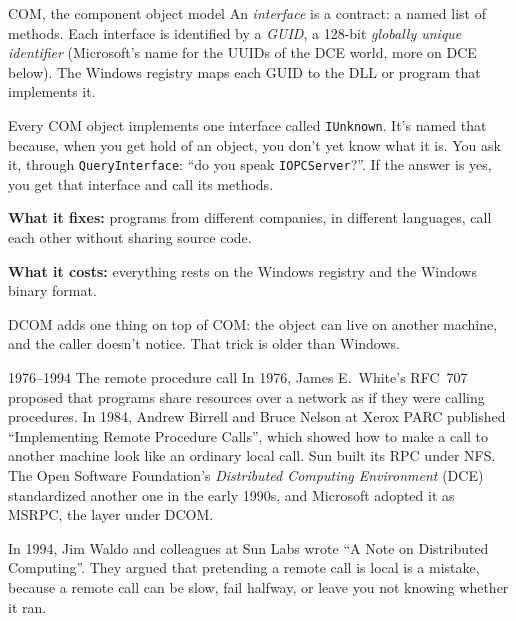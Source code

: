 \begin{concept}{COM, the component object model}
An \emph{interface} is a contract: a named list of methods. Each interface is
identified by a \emph{GUID}, a 128-bit \emph{globally unique identifier}
(Microsoft's name for the UUIDs of the DCE world, more on DCE below). The
Windows registry maps each GUID to the DLL or program that implements it.

Every COM object implements one interface called \texttt{IUnknown}. It's named
that because, when you get hold of an object, you don't yet know what it is. You
ask it, through \texttt{QueryInterface}: ``do you speak \texttt{IOPCServer}?''.
If the answer is yes, you get that interface and call its methods.

\textbf{What it fixes:} programs from different companies, in different
languages, call each other without sharing source code.

\textbf{What it costs:} everything rests on the Windows registry and the Windows
binary format.
\end{concept}

DCOM adds one thing on top of COM: the object can live on another machine, and
the caller doesn't notice. That trick is older than Windows.

\begin{history}{1976--1994 \textperiodcentered{} The remote procedure call}
In 1976, James E.\ White's RFC~707 proposed that programs share resources over
a network as if they were calling procedures. In 1984, Andrew Birrell and Bruce
Nelson at Xerox PARC published ``Implementing Remote Procedure Calls'', which
showed how to make a call to another machine look like an ordinary local call.
Sun built its RPC under NFS. The Open Software Foundation's \emph{Distributed
Computing Environment} (DCE) standardized another one in the early 1990s, and
Microsoft adopted it as MSRPC, the layer under DCOM.

In 1994, Jim Waldo and colleagues at Sun Labs wrote ``A Note on Distributed
Computing''. They argued that pretending a remote call is local is a mistake,
because a remote call can be slow, fail halfway, or leave you not knowing
whether it ran.
\end{history}

